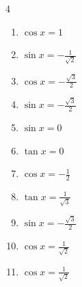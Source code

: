 \begin{multicols}{4}
\begin{enumerate}
  \item $\displaystyle \cos{x}  = 1$


  \item $\displaystyle \sin{x}  = -\frac{1}{\sqrt{2}}$


  \item $\displaystyle \cos{x}  = -\frac{\sqrt{3}}{2}$


\columnbreak %

  \item $\displaystyle \sin{x}  = -\frac{\sqrt{3}}{2}$


  \item $\displaystyle \sin{x}  = 0$


  \item $\displaystyle \tan{x}  = 0$


  \item $\displaystyle \cos{x}  = -\frac{1}{2}$


  \item $\displaystyle \tan{x}  = \frac{1}{\sqrt{3}}$


  \item $\displaystyle \sin{x}  = -\frac{\sqrt{3}}{2}$


  \item $\displaystyle \cos{x}  = \frac{1}{\sqrt{2}}$


  \item $\displaystyle \cos{x}  = \frac{1}{\sqrt{2}}$



\end{enumerate}
\end{multicols}
